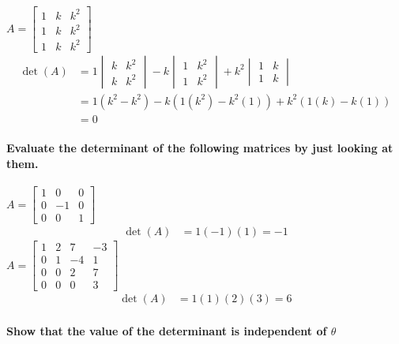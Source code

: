 \documentclass[
  letterpaper,
  DIV=11,
  numbers=noendperiod]{scrartcl}
\let\oldparagraph\paragraph
\renewcommand{\paragraph}[1]{\oldparagraph{#1}\mbox{}}
\begin{document}
\(A = \begin{bmatrix}1 & k & k^2 \\ 1 & k & k^2 \\ 1 & k & k^2\end{bmatrix}\)
\begin{align*}
\det(A) &= 1\begin{vmatrix}k & k^2 \\ k & k^2\end{vmatrix}-k\begin{vmatrix}1 & k^2 \\ 1 & k^2\end{vmatrix}+k^2\begin{vmatrix}1 & k \\ 1 & k\end{vmatrix} \\
&= 1(k^2-k^2)-k(1(k^2)-k^2(1))+k^2(1(k)-k(1)) \\
&= 0
\end{align*}

\hypertarget{evaluate-the-determinant-of-the-following-matrices-by-just-looking-at-them.}{%
\paragraph{Evaluate the determinant of the following matrices by just
looking at
them.}\label{evaluate-the-determinant-of-the-following-matrices-by-just-looking-at-them.}}

\(A=\begin{bmatrix}1 & 0 & 0 \\ 0 & -1 & 0 \\ 0 & 0 & 1 \end{bmatrix}\)
\begin{align*}
\det(A) &= 1(-1)(1) = -1
\end{align*}
\(A=\begin{bmatrix}1 & 2 & 7 & -3 \\ 0 & 1 & -4 & 1 \\ 0 & 0 & 2 & 7 \\ 0 & 0 & 0 & 3 \end{bmatrix}\)
\begin{align*}
\det(A) &= 1(1)(2)(3) = 6
\end{align*}

\hypertarget{show-that-the-value-of-the-determinant-is-independent-of-theta}{%
\paragraph{\texorpdfstring{Show that the value of the determinant is
independent of
\(\theta\)}{Show that the value of the determinant is independent of \textbackslash theta}}\label{show-that-the-value-of-the-determinant-is-independent-of-theta}}
\end{document}
